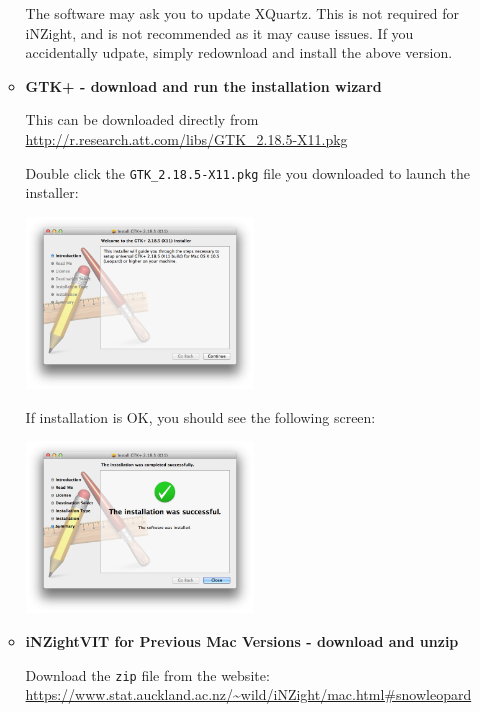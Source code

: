 \documentclass[10pt,a4paper,twoside]{article}
\begin{document}
\begin{enumerate}
\begin{itemize}
    The software may ask you to update XQuartz. This is not required for iNZight, and is
    not recommended as it may cause issues. If you accidentally udpate, simply redownload
    and install the above version.

   

  \item \textbf{GTK+ - download and run the installation wizard}

    This can be downloaded directly from\\ 
    \url{http://r.research.att.com/libs/GTK_2.18.5-X11.pkg}
    
    Double click the \verb+GTK_2.18.5-X11.pkg+ file you downloaded to launch the installer:
    \begin{center}
      \includegraphics[width=0.5\textwidth]{fig/mountain-lion/s1-a.png}
    \end{center}
    
    If installation is OK, you should see the following screen:
    \begin{center}
      \includegraphics[width=0.5\textwidth]{fig/mountain-lion/s1-b.png}
    \end{center}

  \item \textbf{iNZightVIT for Previous Mac Versions - download and unzip}
    
    Download the \verb+zip+ file from the website:\\
    \url{https://www.stat.auckland.ac.nz/~wild/iNZight/mac.html#snowleopard}


\end{itemize}
\end{enumerate}
\end{document}
